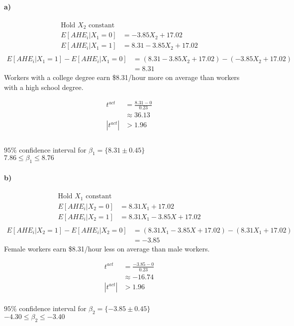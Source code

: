 \documentclass[letterpaper,12pt,titlepage,oneside,final]{book}
\begin{document}
\paragraph{a)}
\begin{align*}
\text{Hold }X_{2} \text{ constant}\\
E[AHE_{i}|X_{1} = 0] &= - 3.85X_{2}+ 17.02 \\
E[AHE_{i}|X_{1} = 1] &= 8.31- 3.85X_{2}+ 17.02 \\
\end{align*}
\begin{align*}
E[AHE_{i}|X_{1} = 1] - E[AHE_{i}|X_{1} = 0] &= (8.31- 3.85X_{2}+ 17.02)- (- 3.85X_{2}+ 17.02)\\
&=8.31
\end{align*}
\indent Workers with a college degree earn \$8.31/hour more on average than workers with a high school degree. 

\begin{align*}
t^{act} &= \frac{8.31 - 0}{0.23}\\
&\approx 36.13 \\
|t^{act}|&> 1.96\\
\end{align*}
\\
$95\%$  confidence interval for $\beta_1 = \{ 8.31 \pm 0.45 \}$\\
$ 7.86 \leq \beta_1 \leq 8.76$



\paragraph{b)}

\begin{align*}
\text{Hold }X_{1} \text{ constant}\\
E[AHE_{i}|X_{2} = 0] &= 8.31X_{1}+ 17.02 \\
E[AHE_{i}|X_{2} = 1] &= 8.31X_{1} - 3.85X + 17.02 \\
\end{align*}
\begin{align*}
E[AHE_{i}|X_{2} = 1] - E[AHE_{i}|X_{2} = 0] &= (8.31X_{1} - 3.85X + 17.02)- (8.31X_{1}+ 17.02)\\
&=-3.85
\end{align*}
\indent Female workers earn \$8.31/hour less on average than male workers.

\begin{align*}
t^{act} &= \frac{-3.85 - 0}{0.23}\\
&\approx -16.74 \\
|t^{act}|&> 1.96
\end{align*}
\\
$95\%$  confidence interval for $\beta_2 = \{ -3.85 \pm 0.45 \}$\\
$ -4.30 \leq \beta_2 \leq -3.40$
\end{document}
